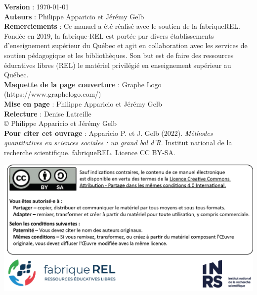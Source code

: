 


\textbf{Version} : \today{} \\[0.05in]
\textbf{Auteurs} : Philippe Apparicio et Jérémy Gelb\\[0.05in]
\textbf{Remerciements} : Ce manuel a été réalisé avec le soutien de la fabriqueREL. Fondée en 2019, la fabrique‑REL est portée par divers établissements d’enseignement supérieur du Québec et agit en collaboration avec les services de soutien pédagogique et les bibliothèques. Son but est de faire des ressources éducatives libres (REL) le matériel privilégié en enseignement supérieur au Québec.\\[0.05in]
\textbf{Maquette de la page couverture} : Graphe Logo (https://www.graphelogo.com/)\\[0.05in]
\textbf{Mise en page} : Philippe Apparicio et Jérémy Gelb\\[0.05in]
\textbf{Relecture} : Denise Latreille\\[0.2in]

© Philippe Apparicio et Jérémy Gelb\\[0.2in]

\textbf{Pour citer cet ouvrage} : Apparicio P. et J. Gelb (2022). \textit{Méthodes quantitatives en sciences sociales : un grand bol d’R}. Institut national de la recherche scientifique. fabriqueREL. Licence CC BY‑SA.\\[1in]

\begin{center}
\includegraphics{images/introduction/CouvertureP2.png}
\end{center}

